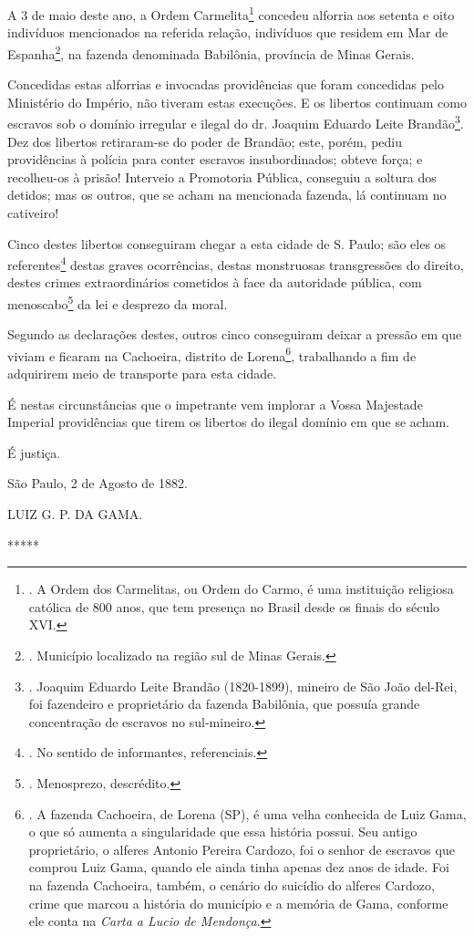 A 3 de maio deste ano, a Ordem Carmelita\footnote{. A Ordem dos
  Carmelitas, ou Ordem do Carmo, é uma instituição religiosa católica de
  800 anos, que tem presença no Brasil desde os finais do século XVI.}
concedeu alforria aos setenta e oito indivíduos mencionados na referida
relação, indivíduos que residem em Mar de Espanha\footnote{. Município
  localizado na região sul de Minas Gerais.}, na fazenda denominada
Babilônia, província de Minas Gerais.

Concedidas estas alforrias e invocadas providências que foram concedidas
pelo Ministério do Império, não tiveram estas execuções. E os libertos
continuam como escravos sob o domínio irregular e ilegal do dr. Joaquim
Eduardo Leite Brandão\footnote{. Joaquim Eduardo Leite Brandão
  (1820-1899), mineiro de São João del-Rei, foi fazendeiro e
  proprietário da fazenda Babilônia, que possuía grande concentração de
  escravos no sul-mineiro.}. Dez dos libertos retiraram-se do poder de
Brandão; este, porém, pediu providências à polícia para conter escravos
insubordinados; obteve força; e recolheu-os à prisão! Interveio a
Promotoria Pública, conseguiu a soltura dos detidos; mas os outros, que
se acham na mencionada fazenda, lá continuam no cativeiro!

Cinco destes libertos conseguiram chegar a esta cidade de S. Paulo; são
eles os referentes\footnote{. No sentido de informantes, referenciais.}
destas graves ocorrências, destas monstruosas transgressões do direito,
destes crimes extraordinários cometidos à face da autoridade pública,
com menoscabo\footnote{. Menosprezo, descrédito.} da lei e desprezo da
moral.

Segundo as declarações destes, outros cinco conseguiram deixar a pressão
em que viviam e ficaram na Cachoeira, distrito de Lorena\footnote{. A
  fazenda Cachoeira, de Lorena (SP), é uma velha conhecida de Luiz Gama,
  o que só aumenta a singularidade que essa história possui. Seu antigo
  proprietário, o alferes Antonio Pereira Cardozo, foi o senhor de
  escravos que comprou Luiz Gama, quando ele ainda tinha apenas dez anos
  de idade. Foi na fazenda Cachoeira, também, o cenário do suicídio do
  alferes Cardozo, crime que marcou a história do município e a memória
  de Gama, conforme ele conta na \emph{Carta a Lucio de Mendonça}.},
trabalhando a fim de
adquirirem meio de transporte para esta cidade.

É nestas circunstâncias que o impetrante vem implorar a Vossa Majestade
Imperial providências que tirem os libertos do ilegal domínio em que se
acham.

É justiça.

São Paulo, 2 de Agosto de 1882.

LUIZ G. P. DA GAMA.

*****
